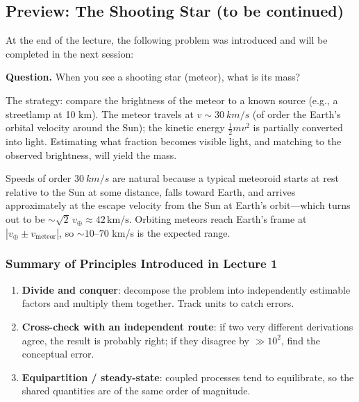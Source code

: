 \subsection{Preview: The Shooting Star (to be continued)}

At the end of the lecture, the following problem was introduced and will be completed in the next session:

\textbf{Question.} When you see a shooting star (meteor), what is its mass?

The strategy: compare the brightness of the meteor to a known source (e.g., a streetlamp at 10 km). The meteor travels at $v \sim \SI{30}{km/s}$ (of order the Earth's orbital velocity around the Sun); the kinetic energy $\tfrac{1}{2}mv^2$ is partially converted into light. Estimating what fraction becomes visible light, and matching to the observed brightness, will yield the mass.

\begin{remark}
  Speeds of order $\SI{30}{km/s}$ are natural because a typical meteoroid starts at rest relative to the Sun at some distance, falls toward Earth, and arrives approximately at the escape velocity from the Sun at Earth's orbit---which turns out to be $\sim\sqrt{2}\,v_\oplus \approx 42\,\text{km/s}$. Orbiting meteors reach Earth's frame at $|v_\oplus \pm v_\text{meteor}|$, so $\sim10$--$70$ km/s is the expected range.
\end{remark}

\subsubsection*{Summary of Principles Introduced in Lecture 1}

\begin{enumerate}
  \item \textbf{Divide and conquer}: decompose the problem into independently estimable factors and multiply them together. Track units to catch errors.
  \item \textbf{Cross-check with an independent route}: if two very different derivations agree, the result is probably right; if they disagree by $\gg 10^2$, find the conceptual error.
  \item \textbf{Equipartition / steady-state}: coupled processes tend to equilibrate, so the shared quantities are of the same order of magnitude.
\end{enumerate}
